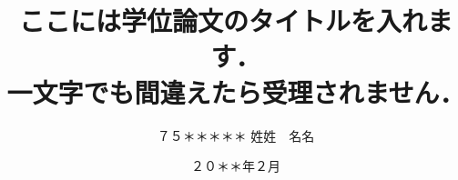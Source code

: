 \documentclass[
    paper=a4paper,      %
    report,             %
    fleqn,              %
    fontsize=12pt,      %
    jafontsize=12pt,    %
    head_space=33mm,    %
    foot_space=30mm,    %
    gutter=25mm,        %
    fore-edge=10mm,     %
    ]{jlreq}            %
\begin{document}


\title{ここには学位論文のタイトルを入れます．\\ 一文字でも間違えたら受理されません．}

\date{２０＊＊年２月}




\author{%
７５＊＊＊＊＊
\zw%
姓姓　名名
} %

\makecover

\tableofcontents



\clearpage
\pagestyle{normal}
\setcounter{page}{0}














\biblist





\end{document}
